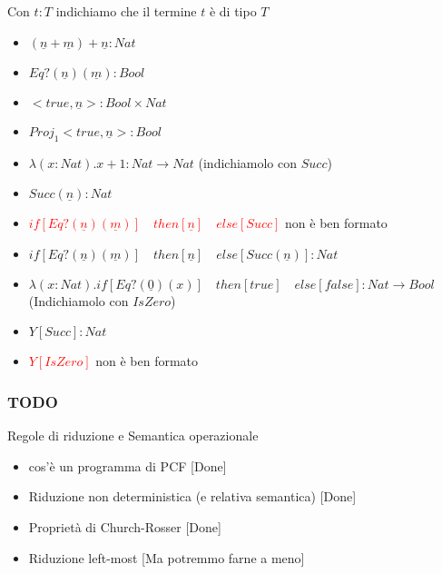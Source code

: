 \documentclass{beamer}
\begin{document}
\begin{frame}
	
	Con $t:T$ indichiamo che il termine $t$ è di tipo $T$
	
	\begin{example}
		\begin{itemize}
			\item $(\underline{n} + \underline{m})+ \underline{n} :Nat$
			\item $Eq?(\underline{n})(\underline{m}):Bool$
			\item $<true,\underline{n}>:Bool \times Nat$
			\item $Proj_1 <true,\underline{n}>:Bool$
			\item $\lambda (x:Nat) . x+1 : Nat\rightarrow Nat$ (indichiamolo con $Succ$)
			\item $Succ(\underline{n}):Nat$
			\item \textcolor{red}{$if[Eq?(\underline{n})(\underline{m})]\quad then [\underline{n}]
			\quad else[Succ]$} non è ben formato
			\item $if[Eq?(\underline{n})(\underline{m})]\quad then [\underline{n}]
			\quad else[ Succ(\underline{n}) ] :Nat$
			\item $\lambda(x:Nat).if[Eq?(\underline{0})(x)]\quad then [true]
			\quad else [false]: Nat \rightarrow Bool$ (Indichiamolo con $IsZero$)
			\item $Y [Succ]:Nat$
			\item \textcolor{red}{$Y[IsZero]$} non è ben formato
		\end{itemize}

	\end{example}

	
\end{frame}


\begin{frame}

	\frametitle{TODO}
	Regole di riduzione e Semantica operazionale
	\begin{itemize}
		\item cos'è un programma di PCF [Done]
		\item Riduzione non deterministica (e relativa semantica) [Done]
		\item Proprietà di Church-Rosser [Done]
		\item Riduzione left-most [Ma potremmo farne a meno]
	\end{itemize}
	
\end{frame}
\end{document}
